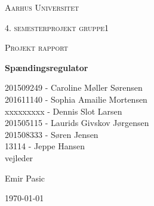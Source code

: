 \thispagestyle{empty}
	{\centering
	{\scshape\LARGE Aarhus Universitet \par}
	\vspace{1cm}
	{\scshape\Large 4. semesterprojekt gruppe1\par}
	{\scshape\Large Projekt rapport\par}
	\vspace{1.5cm}
	{\huge\bfseries Spændingsregulator\par}
	\vspace{2cm}
	{\Large
	201509249 - Caroline Møller Sørensen\\
	201611140 - Sophia Amailie Mortensen\\
	xxxxxxxxx - Dennis Slot Larsen \\
	201505115 - Laurids Givskov Jørgensen\\
	201508333 - Søren Jensen\\
	13114 - Jeppe Hansen\\   }
	\vfill
	vejleder\par
	Emir Pasic

	\vfill

	{\large \today\par}
\par}

